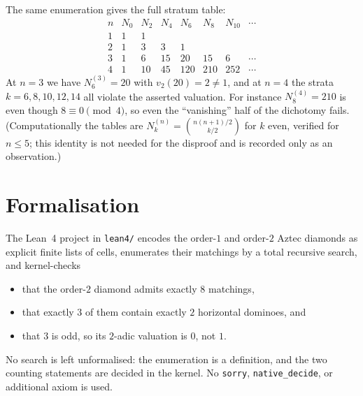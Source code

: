 \documentclass[11pt]{article}
\begin{document}
The same enumeration gives the full stratum table:
\[
\begin{array}{c|ccccccc}
n & N_0 & N_2 & N_4 & N_6 & N_8 & N_{10} & \cdots\\ \hline
1 & 1 & 1 & & & & & \\
2 & 1 & 3 & 3 & 1 & & & \\
3 & 1 & 6 & 15 & 20 & 15 & 6 & \cdots\\
4 & 1 & 10 & 45 & 120 & 210 & 252 & \cdots
\end{array}
\]
At $n = 3$ we have $N_6^{(3)} = 20$ with $v_2(20) = 2 \ne 1$, and at $n = 4$
the strata $k = 6, 8, 10, 12, 14$ all violate the asserted valuation.  For
instance $N_8^{(4)} = 210$ is even though $8 \equiv 0 \pmod 4$, so even the
``vanishing'' half of the dichotomy fails.  (Computationally the tables are
$N_k^{(n)} = \binom{n(n+1)/2}{k/2}$ for $k$ even, verified for $n \le 5$; this
identity is not needed for the disproof and is recorded only as an
observation.)

\section*{Formalisation}

The Lean~4 project in \texttt{lean4/} encodes the order-$1$ and order-$2$
Aztec diamonds as explicit finite lists of cells, enumerates their matchings by
a total recursive search, and kernel-checks
\begin{itemize}
  \item that the order-$2$ diamond admits exactly $8$ matchings,
  \item that exactly $3$ of them contain exactly $2$ horizontal dominoes, and
  \item that $3$ is odd, so its $2$-adic valuation is $0$, not $1$.
\end{itemize}
No search is left unformalised: the enumeration is a definition, and the two
counting statements are decided in the kernel.  No \texttt{sorry},
\texttt{native\_decide}, or additional axiom is used.
\end{document}
